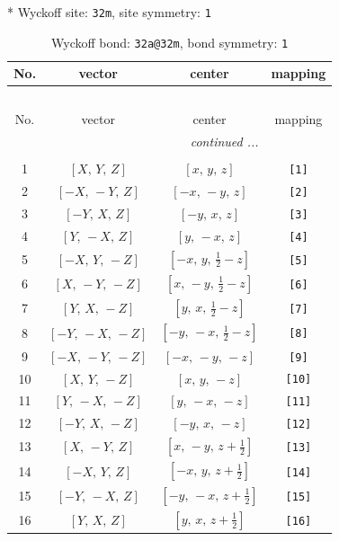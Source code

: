 \documentclass[fleqn,8pt]{jsarticle}
\begin{document}
* Wyckoff site: {\tt 32m}, site symmetry: {\tt 1}
\renewcommand{\arraystretch}{1.2}
\begin{longtable}{cccc}
\caption{Wyckoff bond: {\tt 32a@32m}, bond symmetry: {\tt 1}}
 \\
 \hline \hline
No. & vector & center & mapping \\ \hline \endfirsthead

\multicolumn{3}{l}{\tablename\ \thetable{}} \\
 \hline \hline
No. & vector & center & mapping \\ \hline \endhead

 \hline \hline
\multicolumn{3}{r}{\footnotesize\it continued ...} \\ \endfoot

 \hline \hline
\multicolumn{3}{r}{} \\ \endlastfoot

1 & $\left[ X,\, Y,\, Z \right]$ & $\left[ x,\, y,\, z \right]$ & {\tt [1]} \\ \hline
2 & $\left[ - X,\, - Y,\, Z \right]$ & $\left[ - x,\, - y,\, z \right]$ & {\tt [2]} \\ \hline
3 & $\left[ - Y,\, X,\, Z \right]$ & $\left[ - y,\, x,\, z \right]$ & {\tt [3]} \\ \hline
4 & $\left[ Y,\, - X,\, Z \right]$ & $\left[ y,\, - x,\, z \right]$ & {\tt [4]} \\ \hline
5 & $\left[ - X,\, Y,\, - Z \right]$ & $\left[ - x,\, y,\, \frac{1}{2} - z \right]$ & {\tt [5]} \\ \hline
6 & $\left[ X,\, - Y,\, - Z \right]$ & $\left[ x,\, - y,\, \frac{1}{2} - z \right]$ & {\tt [6]} \\ \hline
7 & $\left[ Y,\, X,\, - Z \right]$ & $\left[ y,\, x,\, \frac{1}{2} - z \right]$ & {\tt [7]} \\ \hline
8 & $\left[ - Y,\, - X,\, - Z \right]$ & $\left[ - y,\, - x,\, \frac{1}{2} - z \right]$ & {\tt [8]} \\ \hline
9 & $\left[ - X,\, - Y,\, - Z \right]$ & $\left[ - x,\, - y,\, - z \right]$ & {\tt [9]} \\ \hline
10 & $\left[ X,\, Y,\, - Z \right]$ & $\left[ x,\, y,\, - z \right]$ & {\tt [10]} \\ \hline
11 & $\left[ Y,\, - X,\, - Z \right]$ & $\left[ y,\, - x,\, - z \right]$ & {\tt [11]} \\ \hline
12 & $\left[ - Y,\, X,\, - Z \right]$ & $\left[ - y,\, x,\, - z \right]$ & {\tt [12]} \\ \hline
13 & $\left[ X,\, - Y,\, Z \right]$ & $\left[ x,\, - y,\, z + \frac{1}{2} \right]$ & {\tt [13]} \\ \hline
14 & $\left[ - X,\, Y,\, Z \right]$ & $\left[ - x,\, y,\, z + \frac{1}{2} \right]$ & {\tt [14]} \\ \hline
15 & $\left[ - Y,\, - X,\, Z \right]$ & $\left[ - y,\, - x,\, z + \frac{1}{2} \right]$ & {\tt [15]} \\ \hline
16 & $\left[ Y,\, X,\, Z \right]$ & $\left[ y,\, x,\, z + \frac{1}{2} \right]$ & {\tt [16]} \\
\end{longtable}
\end{document}
